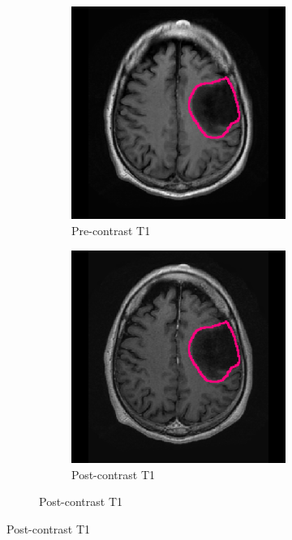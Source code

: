 \begin{subappendices}
\begin{figure}[htbp]
    \centering
    \begin{subfigure}[b]{0.95\textwidth}
        \centering
        \hfill
        \begin{subfigure}[b]{0.215\textwidth}
        \caption*{Pre-contrast \acrshort{T1}}
        \includegraphics[width=\textwidth, clip, trim=2.5cm 0.5cm 2.5cm 0.5cm]{Figures/Random_segs/T1_TCGA-DU-7301.png}
        \end{subfigure}
        \hfill
        \begin{subfigure}[b]{0.215\textwidth}
        \caption*{Post-contrast \acrshort{T1}}
        \includegraphics[width=\textwidth, clip, trim=2.5cm 0.5cm 2.5cm 0.5cm]{Figures/Random_segs/T1GD_TCGA-DU-7301.png}

\end{subfigure}
\end{subfigure}
\end{figure}
\end{subappendices}
